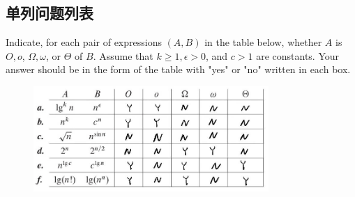 \documentclass{gjm_hw}
\begin{document}
  \subsection{单列问题列表}
    \setcounter{ProblemCounter}{1}
    \begin{problem}
    Indicate, for each pair of expressions $(A, B)$ in the table below, whether $A$ is $O, o$, $\Omega, \omega$, or $\Theta$ of $B$. Assume that $k \geq 1, \epsilon>0$, and $c>1$ are constants. Your answer should be in the form of the table with "yes" or "no" written in each box. \par
    \begin{solution}
    \begin{figure}[H]
        \centering
        \includegraphics[height=4cm]{images/3-2.jpg}
    \end{figure}
    \end{solution}
    \end{problem}
    
\end{document}

